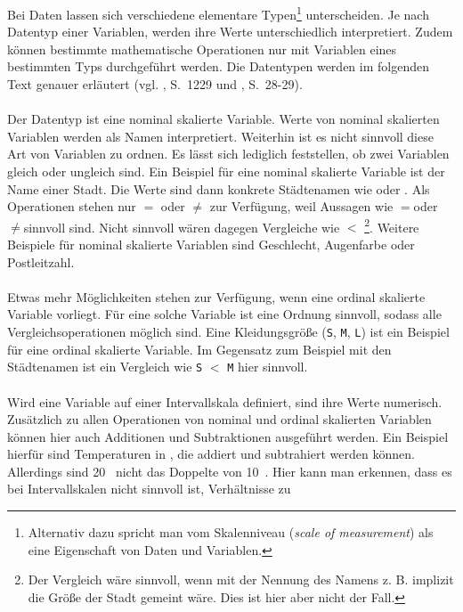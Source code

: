 Bei Daten lassen sich verschiedene elementare Typen\footnote{Alternativ dazu
spricht man vom Skalenniveau (\emph{scale of measurement}) als eine
Eigenschaft von Daten und Variablen.} unterscheiden.
Je nach Datentyp einer
Variablen, werden ihre Werte unterschiedlich interpretiert. Zudem können
bestimmte mathematische Operationen nur mit Variablen eines bestimmten Typs
durchgeführt werden. Die Datentypen werden im folgenden Text genauer erläutert
(vgl. \cite{Arens}, S.~1229 und \cite{McCarthy}, S.~28-29).\\ \\
Der \grqq Datentyp ist eine nominal skalierte Variable. 
Werte von nominal skalierten Variablen werden als Namen
interpretiert. Weiterhin ist es nicht sinnvoll diese Art von Variablen zu
ordnen. Es lässt sich lediglich feststellen, ob zwei Variablen
gleich oder ungleich sind. Ein Beispiel für eine nominal skalierte Variable ist
der Name einer Stadt. Die Werte sind dann konkrete Städtenamen wie
\grqq oder \grqq. Als Operationen stehen nur $=$
oder $\neq$ zur Verfügung, weil Aussagen wie 
\grqq$=$\grqq oder
\grqq$\neq$\grqq sinnvoll sind. Nicht sinnvoll wären
dagegen Vergleiche wie \grqq$<$\grqq
\footnote{Der Vergleich wäre sinnvoll, wenn mit der Nennung des Namens 
z. B. implizit die Größe der Stadt gemeint wäre. Dies ist hier aber nicht der
Fall.}.
Weitere Beispiele für nominal skalierte Variablen sind Geschlecht, Augenfarbe
oder Postleitzahl. \\ \\
Etwas mehr Möglichkeiten stehen zur Verfügung, wenn eine ordinal skalierte
Variable vorliegt. Für eine solche Variable ist eine Ordnung sinnvoll, sodass
alle Vergleichsoperationen möglich sind. Eine Kleidungsgröße (\texttt{S},
\texttt{M}, \texttt{L}) ist ein Beispiel für eine ordinal skalierte
Variable. Im Gegensatz zum Beispiel mit den Städtenamen ist ein Vergleich wie
\texttt{S} $<$ \texttt{M} hier sinnvoll. \\ \\
Wird eine Variable auf einer Intervallskala definiert, sind ihre Werte
numerisch.
Zusätzlich zu
allen Operationen von nominal und ordinal skalierten Variablen können hier auch
Additionen und Subtraktionen ausgeführt werden. Ein Beispiel hierfür sind
Temperaturen in , die addiert und subtrahiert werden können.
Allerdings sind 20~ nicht das Doppelte von 10~. Hier kann
man erkennen, dass es bei Intervallskalen nicht sinnvoll ist, Verhältnisse zu
